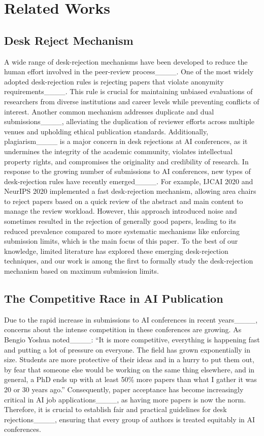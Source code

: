 \section{Related Works}
\label{sec:related_works}

\subsection{Desk Reject Mechanism}


A wide range of desk-rejection mechanisms have been developed to reduce the human effort involved in the peer-review process____. One of the most widely adopted desk-rejection rules is rejecting papers that violate anonymity requirements____. This rule is crucial for maintaining unbiased evaluations of researchers from diverse institutions and career levels while preventing conflicts of interest. Another common mechanism addresses duplicate and dual submissions____, alleviating the duplication of reviewer efforts across multiple venues and upholding ethical publication standards. Additionally, plagiarism____ is a major concern in desk rejections at AI conferences, as it undermines the integrity of the academic community, violates intellectual property rights, and compromises the originality and credibility of research. In response to the growing number of submissions to AI conferences, new types of desk-rejection rules have recently emerged____. For example, IJCAI 2020 and NeurIPS 2020 implemented a fast desk-rejection mechanism, allowing area chairs to reject papers based on a quick review of the abstract and main content to manage the review workload. However, this approach introduced noise and sometimes resulted in the rejection of generally good papers, leading to its reduced prevalence compared to more systematic mechanisms like enforcing submission limits, which is the main focus of this paper. To the best of our knowledge, limited literature has explored these emerging desk-rejection techniques, and our work is among the first to formally study the desk-rejection mechanism based on maximum submission limits.

\subsection{The Competitive Race in AI Publication}


Due to the rapid increase in submissions to AI conferences in recent years____, concerns about the intense competition in these conferences are growing. As Bengio Yoshua noted____: ``It is more competitive, everything is happening fast and putting a lot of pressure on everyone. The field has grown exponentially in size. Students are more protective of their ideas and in a hurry to put them out, by fear that someone else would be working on the same thing elsewhere, and in general, a PhD ends up with at least 50\% more papers than what I gather it was 20 or 30 years ago.'' Consequently, paper acceptance has become increasingly critical in AI job applications____, as having more papers is now the norm. Therefore, it is crucial to establish fair and practical guidelines for desk rejections____, ensuring that every group of authors is treated equitably in AI conferences. 



